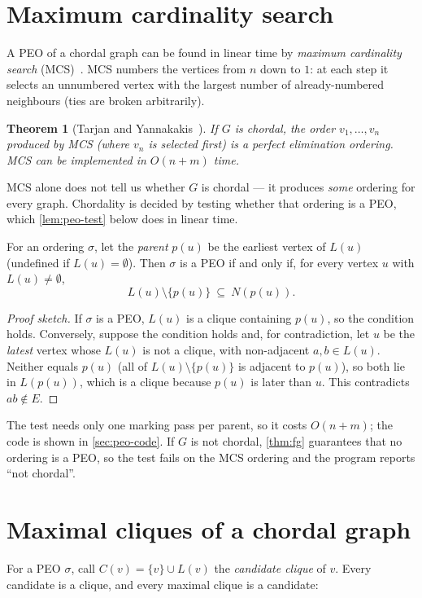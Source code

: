 \documentclass[11pt,a4paper,oneside]{report}
\theoremstyle{plain}
\newtheorem{theorem}{Theorem}[chapter]
\theoremstyle{definition}
\theoremstyle{remark}
\begin{document}
\section{Maximum cardinality search}\label{sec:mcs-background}
A PEO of a chordal graph can be found in linear time by \emph{maximum cardinality search}
(MCS)~\cite{tarjan1984}. MCS numbers the vertices from \(n\) down to \(1\): at each step it
selects an unnumbered vertex with the largest number of already-numbered neighbours (ties are
broken arbitrarily).

\begin{theorem}[Tarjan and Yannakakis~\cite{tarjan1984}]\label{thm:mcs}
If \(G\) is chordal, the order \(v_1,\dots,v_n\) produced by MCS (where \(v_n\) is selected
first) is a perfect elimination ordering. MCS can be implemented in \(O(n+m)\) time.
\end{theorem}

MCS alone does not tell us whether \(G\) is chordal --- it produces \emph{some} ordering for
every graph. Chordality is decided by testing whether that ordering is a PEO, which
\cref{lem:peo-test} below does in linear time.

\begin{lemma}\label{lem:peo-test}
For an ordering \(\sigma\), let the \emph{parent} \(p(u)\) be the earliest vertex of \(L(u)\)
(undefined if \(L(u)=\emptyset\)). Then \(\sigma\) is a PEO if and only if, for every vertex
\(u\) with \(L(u)\ne\emptyset\),
\[ L(u)\setminus\{p(u)\}\ \subseteq\ N(p(u)). \]
\end{lemma}
\begin{proof}[Proof sketch]
If \(\sigma\) is a PEO, \(L(u)\) is a clique containing \(p(u)\), so the condition holds.
Conversely, suppose the condition holds and, for contradiction, let \(u\) be the
\emph{latest} vertex whose \(L(u)\) is not a clique, with non-adjacent \(a,b\in L(u)\). Neither
equals \(p(u)\) (all of \(L(u)\setminus\{p(u)\}\) is adjacent to \(p(u)\)), so both lie in
\(L(p(u))\), which is a clique because \(p(u)\) is later than \(u\). This contradicts
\(ab\notin E\).
\end{proof}
The test needs only one marking pass per parent, so it costs \(O(n+m)\); the code is shown in
\cref{sec:peo-code}. If \(G\) is not chordal, \cref{thm:fg} guarantees that no ordering is a
PEO, so the test fails on the MCS ordering and the program reports ``not chordal''.

\section{Maximal cliques of a chordal graph}\label{sec:cliques-background}
For a PEO \(\sigma\), call \(C(v)=\{v\}\cup L(v)\) the \emph{candidate clique} of \(v\). Every
candidate is a clique, and every maximal clique is a candidate:
\end{document}
